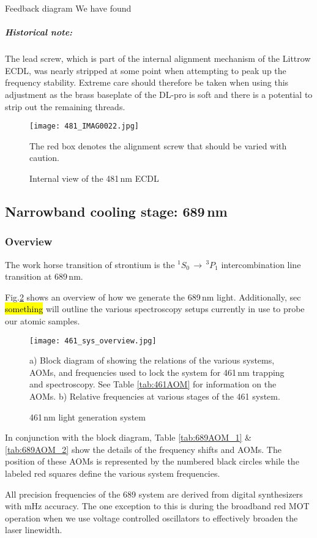Feedback diagram
We have found

\subparagraph{Historical note:}
The lead screw, which is part of the internal alignment mechanism of the Littrow ECDL, was nearly stripped at some point when attempting to peak up the frequency stability. 
Extreme care should therefore be taken when using this adjustment as the brass baseplate of the DL-pro is soft and there is a potential to strip out the remaining threads.
	\begin{figure}
		\centerline{
		\texttt{[image: 481\_IMAG0022.jpg]}}
		\caption{Internal view of the 481\,nm ECDL}{The red box denotes the alignment screw that should be varied with caution.}
		\label{fig:481internal}
	\end{figure}
 

\subsection{Narrowband cooling stage: 689\,nm} \label{ssec:689sys}
\subsubsection{Overview}
The work horse transition of strontium is the $^1S_0\,\rightarrow\,^3P_1$ intercombination line transition at 689\,nm. 

Fig.\ref{fig:689blockSys} shows an overview of how we generate the 689\,nm light. 
Additionally, sec \hl{something} will outline the various spectroscopy setups currently in use to probe our atomic samples.
	\begin{figure}
		\centerline{
		\texttt{[image: 461\_sys\_overview.jpg]}}
		\caption{461\,nm light generation system}{a) Block diagram of showing the relations of the various systems, AOMs, and frequencies used to lock the system for 461\,nm trapping and spectroscopy. See Table \ref{tab:461AOM} for information on the AOMs. b) Relative frequencies at various stages of the 461 system.}
		\label{fig:689blockSys}
	\end{figure} 

In conjunction with the block diagram, Table \ref{tab:689AOM_1} \& \ref{tab:689AOM_2} show the details of the frequency shifts and AOMs. 
The position of these AOMs is represented by the numbered black circles while the labeled red squares define the various system frequencies.

All precision frequencies of the 689 system are derived from digital synthesizers with mHz accuracy.
The one exception to this is during the broadband red MOT operation when we use voltage controlled oscillators to effectively broaden the laser linewidth.

